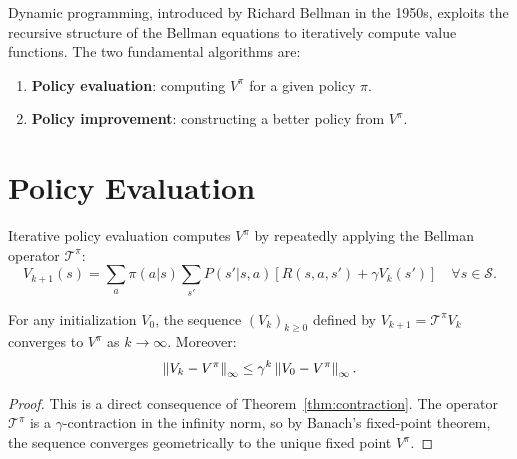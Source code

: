 Dynamic programming, introduced by Richard Bellman in the 1950s, exploits the
recursive structure of the Bellman equations to iteratively compute value
functions. The two fundamental algorithms are:
\begin{enumerate}
    \item \textbf{Policy evaluation}: computing $V^\pi$ for a given policy $\pi$.
    \item \textbf{Policy improvement}: constructing a better policy from $V^\pi$.
\end{enumerate}

\section{Policy Evaluation}

\begin{definition}
Iterative policy evaluation computes $V^\pi$ by repeatedly applying the
Bellman operator $\mathcal{T}^\pi$:
\[
    V_{k+1}(s) = \sum_{a} \pi(a|s) \sum_{s'} P(s'|s,a)[R(s,a,s') + \gamma V_k(s')]
    \quad \forall s \in \mathcal{S}.
\]
\end{definition}

\begin{theorem}
\label{thm:conv_eval}
For any initialization $V_0$, the sequence $(V_k)_{k \geq 0}$ defined by
$V_{k+1} = \mathcal{T}^\pi V_k$ converges to $V^\pi$ as $k \to \infty$.
Moreover:
\[
    \left\| V_k - V^\pi \right\|_\infty \leq \gamma^k \left\| V_0 - V^\pi \right\|_\infty.
\]
\end{theorem}

\begin{proof}
This is a direct consequence of Theorem~\ref{thm:contraction}. The operator
$\mathcal{T}^\pi$ is a $\gamma$-contraction in the infinity norm, so by
Banach's fixed-point theorem, the sequence converges geometrically to the
unique fixed point $V^\pi$.
\end{proof}

